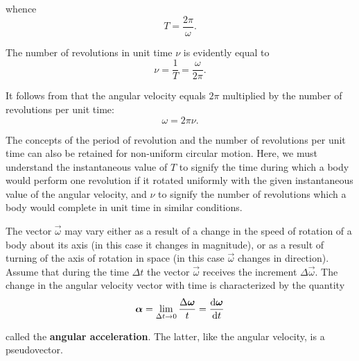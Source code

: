 \noindent
whence
\begin{equation}\label{eq:1_95}
T = \frac{2\pi}{\omega}.
\end{equation}

The number of revolutions in unit time $\nu$ is evidently equal to
\begin{equation}\label{eq:1_96}
\nu = \frac{1}{T} = \frac{\omega}{2\pi}.
\end{equation}

\noindent
It follows from  that the angular velocity equals $2\pi$ multiplied by the number of revolutions per unit time:
\begin{equation}\label{eq:1_97}
\omega = 2\pi\nu.
\end{equation}

The concepts of the period of revolution and the number of revolutions per unit time can also be retained for non-uniform circular motion. Here, we must understand the instantaneous value of $T$ to signify the time during which a body would perform one revolution if it rotated uniformly with the given instantaneous value of the angular velocity, and $\nu$ to signify the number of revolutions which a body would complete in unit time in similar conditions.

The vector $\vec{\omega}$ may vary either as a result of a change in the speed of rotation of a body about its axis (in this case it changes in magnitude), or as a result of turning of the axis of rotation in space (in this case $\vec{\omega}$ changes in direction). Assume that during the time $\Delta t$ the vector $\vec{\omega}$ receives the increment $\Delta\vec{\omega}$. The change in the angular velocity vector with time is characterized by the quantity
\begin{equation}\label{eq:1_98}
\boldsymbol{\alpha} = \lim_{\Delta t\to 0} \frac{\Delta\boldsymbol{\omega}}{t} = \frac{\mathrm{d}\boldsymbol{\omega}}{\mathrm{d} t}
\end{equation}

\noindent
called the \textbf{angular acceleration}. The latter, like the angular velocity, is a pseudovector.


